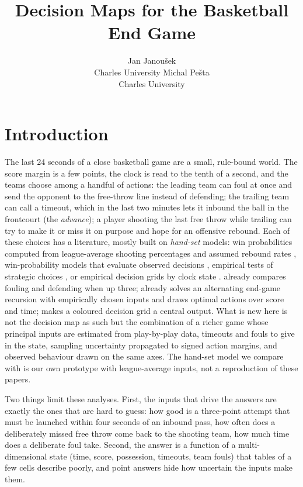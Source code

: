 \documentclass[article]{jdssv}
\author{Jan Janou\v{s}ek\\Charles University
   \And Michal Pe\v{s}ta\\Charles University}
\title{Decision Maps for the Basketball End Game}
\begin{document}
\section{Introduction} \label{sec:intro}

The last 24 seconds of a close basketball game are a small, rule-bound world. The score margin is a few
points, the clock is read to the tenth of a second, and the teams choose among a handful of actions: the
leading team can foul at once and send the opponent to the free-throw line instead of defending; the
trailing team can call a timeout, which in the last two minutes lets it inbound the ball in the frontcourt
(the \emph{advance}); a player shooting the last free throw while trailing can try to make it or miss it on
purpose and hope for an offensive rebound. Each of these choices has a literature, mostly built on
\emph{hand-set} models: win probabilities computed from league-average shooting percentages and assumed
rebound rates \citep{Annis2006, Kenter2015, SkinnerGoldman2015}, win-probability models that evaluate observed
decisions \citep{McFarlane2019}, empirical tests of strategic choices \citep{Secilmis2025}, or empirical decision
grids by clock state \citep{ZapataHall2024}. \citet{Annis2006} already compares fouling and defending when up three;
\citet{Kenter2015} already solves an alternating end-game recursion with empirically chosen inputs and draws optimal
actions over score and time; \citet{ZapataHall2024} makes a coloured decision grid a central output. What is new here
is not the decision map as such but the combination of a richer game whose principal inputs are estimated from
play-by-play data, timeouts and fouls to give in the state, sampling uncertainty propagated to signed action
margins, and observed behaviour drawn on the same axes. The hand-set model we compare with is our own
prototype with league-average inputs, not a reproduction of these papers.

Two things limit these analyses. First, the inputs that drive the answers are exactly the ones that are
hard to guess: how good is a three-point attempt that must be launched within four seconds of an inbound
pass, how often does a deliberately missed free throw come back to the shooting team, how much time does a
deliberate foul take. Second, the answer is a function of a multi-dimensional state (time, score,
possession, timeouts, team fouls) that tables of a few cells describe poorly, and point answers hide how
uncertain the inputs make them.
\end{document}

